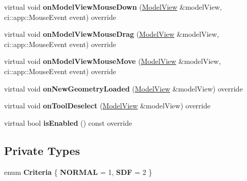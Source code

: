 \begin{DoxyCompactItemize}
\item 
\mbox{\label{classpepr3d_1_1_semiautomatic_segmentation_a4c3f72008481531cc952c9d7957fb928}} 
virtual void {\bfseries on\+Model\+View\+Mouse\+Down} (\mbox{\hyperlink{classpepr3d_1_1_model_view}{Model\+View}} \&model\+View, ci\+::app\+::\+Mouse\+Event event) override
\item 
\mbox{\label{classpepr3d_1_1_semiautomatic_segmentation_a77e201830fcc97742fae904303cbcc01}} 
virtual void {\bfseries on\+Model\+View\+Mouse\+Drag} (\mbox{\hyperlink{classpepr3d_1_1_model_view}{Model\+View}} \&model\+View, ci\+::app\+::\+Mouse\+Event event) override
\item 
\mbox{\label{classpepr3d_1_1_semiautomatic_segmentation_afb75b5da63d4444c57f4f75ae1660935}} 
virtual void {\bfseries on\+Model\+View\+Mouse\+Move} (\mbox{\hyperlink{classpepr3d_1_1_model_view}{Model\+View}} \&model\+View, ci\+::app\+::\+Mouse\+Event event) override
\item 
\mbox{\label{classpepr3d_1_1_semiautomatic_segmentation_aa682000b0095bf95a3d67d54977324bc}} 
virtual void {\bfseries on\+New\+Geometry\+Loaded} (\mbox{\hyperlink{classpepr3d_1_1_model_view}{Model\+View}} \&model\+View) override
\item 
\mbox{\label{classpepr3d_1_1_semiautomatic_segmentation_aa7992f161194bd23ddff96433819029d}} 
virtual void {\bfseries on\+Tool\+Deselect} (\mbox{\hyperlink{classpepr3d_1_1_model_view}{Model\+View}} \&model\+View) override
\item 
\mbox{\label{classpepr3d_1_1_semiautomatic_segmentation_a5883c42824da8d5adec628e065e317b3}} 
virtual bool {\bfseries is\+Enabled} () const override
\end{DoxyCompactItemize}
\subsection*{Private Types}
\begin{DoxyCompactItemize}
\item 
\mbox{\label{classpepr3d_1_1_semiautomatic_segmentation_a97a8b6061b26cb4dd67ac14eace1f30b}} 
enum {\bfseries Criteria} \{ {\bfseries N\+O\+R\+M\+AL} = 1, 
{\bfseries S\+DF} = 2
 \}
\end{DoxyCompactItemize}

